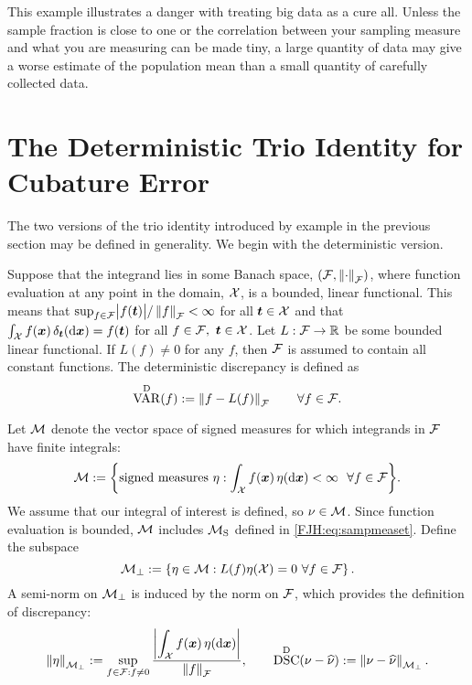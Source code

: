 \documentclass[graybox,footinfo]{svmult}
\DeclareMathOperator{\disc}{DSC}
\DeclareMathOperator{\Var}{VAR}
\begin{document}
This example illustrates a danger with treating big data as a cure all. Unless 
the 
sample fraction is close to one or the correlation between 
your sampling measure and what you are measuring can be made tiny, a large quantity of 
data may give a worse estimate of the population mean than a small quantity of carefully 
collected data.

\begin{FJHLesson}
	\FJHLessonOne
\end{FJHLesson}

\section{The Deterministic Trio Identity for Cubature Error} \label{FJH:sec:dettrio}
The two versions of the trio identity introduced by example in the previous section may 
be defined in generality. We begin with the deterministic version.  

Suppose that the integrand lies in some Banach space, $(\mathcal{F},\left \lVert \cdot \right \rVert_{\mathcal{F}})$, where 
function 
evaluation at any point  in the 
domain,  $\mathcal{X}$, is a 
bounded, linear functional.  This means that $\sup_{f \in \mathcal{F}} \bigl \lvert f({\boldsymbol{t}}) \bigr \rvert/\left \lVert f \right \rVert_{\mathcal{F}} < 
\infty$ for all ${\boldsymbol{t}} \in \mathcal{X}$ and that $\int_{\mathcal{X}} f({\boldsymbol{x}}) \, \delta_{{\boldsymbol{t}}}(\mathrm{d}{\boldsymbol{x}}) =f({\boldsymbol{t}})$ 
for all $f \in \mathcal{F}, \ {\boldsymbol{t}} \in \mathcal{X}$.  Let $L :\mathcal{F} \to {\mathbb{R}}$ be some bounded 
linear functional.  If $L(f) \ne 0$ for any $f$, then $\mathcal{F}$ is assumed to contain all 
constant functions.  The deterministic discrepancy is defined as 
\begin{equation}  \label{FJH:eq:detvardef}
\Var^{\Dt}(f) := \norm{f- L(f)}_{\cf} \qquad \forall f \in \cf.
\end{equation} 

Let $\mathcal{M}$ denote the vector space of signed measures for which integrands in $\mathcal{F}$ 
have finite integrals:
\begin{equation*}
\cm : = \biggl \{\text{signed measures } \eta : \int_{\cx} f(\bsx) \, \eta(\D\bsx) < \infty \ \ 
\forall f \in \cf \biggr \}.
\end{equation*}
We assume that our integral of interest is defined, so $\nu \in \mathcal{M}$.  Since function 
evaluation is bounded, $\mathcal{M}$ includes $\mathcal{M}_{\textup{S}}$ defined in 
\eqref{FJH:eq:sampmeaset}.  Define the subspace  
\begin{equation} \label{FJH:eq:Mperpdef}
\cm_\bot : = \left \{\eta \in \cm :  L(f) \eta(\cx) = 0  \ \forall f \in \cf
\right\}.
\end{equation} 
A semi-norm on $\mathcal{M}_\bot$ is induced by the norm on $\mathcal{F}$, which provides the 
definition of discrepancy:
\begin{equation} \label{FJH:eq:detdiscdef}
\snorm{\eta}_{\cm_\bot}  : =\sup_{f \in \cf : f \ne 0} \frac{\displaystyle \biggabs{\int_{\cx} 
f(\bsx) \, \eta(\D \bsx)}}{\norm{f}_{\cf}}, \qquad \disc^\Dt(\nu - \hnu) : = \norm{\nu - 
\hnu}_{\cm_\bot}.
\end{equation}
\end{document}
